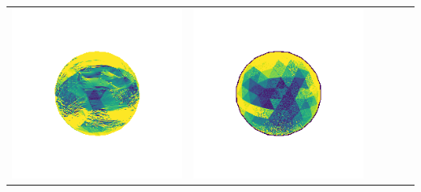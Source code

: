 \begin{center}
\begin{tabularx}{\linewidth}{@{}Y@{}Y@{}Y@{}Y@{}Y@{}Y@{}}
\includegraphics[width=\linewidth]{semisynthetic/20150514_1_yu_err.png} &
\includegraphics[width=\linewidth]{semisynthetic/20150514_1_dpsn_err.png} &

\end{tabularx}
\end{center}
